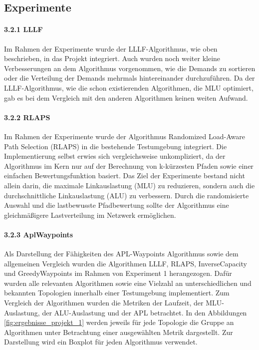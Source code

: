 \documentclass[sigconf,nonacm,review,language=english,language=german]{acmart}
\begin{document}
    
    
    \subsection{Experimente}
        \paragraph{3.2.1   LLLF}
            Im Rahmen der Experimente wurde der LLLF-Algorithmus, wie oben beschrieben, in das Projekt integriert. Auch wurden noch weiter kleine Verbesserungen an dem Algorithmus vorgenommen, wie die Demands zu sortieren oder die Verteilung der Demands mehrmals hintereinander durchzuführen. Da der LLLF-Algorithmus, wie die schon existierenden Algorithmen, die MLU optimiert, gab es bei dem Vergleich mit den anderen Algorithmen keinen weiten Aufwand.

        \paragraph{3.2.2   RLAPS}
            Im Rahmen der Experimente wurde der Algorithmus Randomized Load-Aware Path Selection (RLAPS) in die bestehende Testumgebung integriert. Die Implementierung selbst erwies sich vergleichsweise unkompliziert, da der Algorithmus im Kern nur auf der Berechnung von k-kürzesten Pfaden sowie einer einfachen Bewertungsfunktion basiert.
            Das Ziel der Experimente bestand nicht allein darin, die maximale Linkauslastung (MLU) zu reduzieren, sondern auch die durchschnittliche Linkauslastung (ALU) zu verbessern. Durch die randomisierte Auswahl und die lastbewusste Pfadbewertung sollte der Algorithmus eine gleichmäßigere Lastverteilung im Netzwerk ermöglichen.

        \paragraph{3.2.3   AplWaypoints}
            Als Darstellung der Fähigkeiten des APL-Waypoints Algorithmus sowie dem allgemeinen Vergleich wurden die Algorithmen LLLF, RLAPS, InverseCapacity und GreedyWaypoints im Rahmen von Experiment 1 herangezogen. Dafür wurden alle relevanten Algorithmen sowie eine Vielzahl an unterschiedlichen und bekannten Topologien innerhalb einer Testumgebung implementiert. Zum Vergleich der Algorithmen wurden die Metriken der Laufzeit, der MLU-Auslastung, der ALU-Auslastung und der APL betrachtet. In den Abbildungen \ref{fig:ergebnisse_projekt_1} werden jeweils für jede Topologie die Gruppe an Algorithmen unter Betrachtung einer ausgewählten Metrik dargestellt. Zur Darstellung wird ein Boxplot für jeden Algorithmus verwendet.
 
\end{document}
